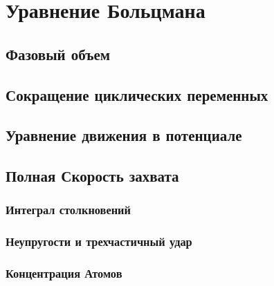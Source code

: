 	


	
	\section{Уравнение Больцмана}
	\subsection{Фазовый объем}
	
	\subsection{Сокращение циклических переменных}
	
	\subsection{Уравнение движения в потенциале}
	
	\subsection{Полная Скорость захвата}
		
	\subsubsection{Интеграл столкновений}
	
	\subsubsection{Неупругости и трехчастичный удар}
	
	\subsubsection{Концентрация Атомов}
	
	
